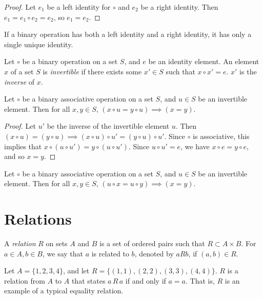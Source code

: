 \begin{proof}
    Let $e_1$ be a left identity for $\circ$ and $e_2$ be a right identity. Then $e_1 = e_1 \circ e_2 = e_2$, so $e_1 = e_2$.
\end{proof}

\begin{cor}
    If a binary operation has both a left identity and a right identity, it has only a single unique identity.
\end{cor}

\begin{defn}
    Let $\circ$ be a binary operation on a set $S$, and $e$ be an identity element. An element $x$ of a set $S$ is \emph{invertible} if there exists some $x' \in S$ such that $x \circ x' = e$. $x'$ is the \emph{inverse} of $x$.
\end{defn}

\begin{thm}
    Let $\circ$ be a binary associative operation on a set $S$, and $u \in S$ be an invertible element. Then for all $x, y \in S$, $(x \circ u = y \circ u) \implies (x = y)$.
\end{thm}

\begin{proof}
    Let $u'$ be the inverse of the invertible element $u$. Then $(x \circ u) = (y \circ u) \implies (x \circ u) \circ u' = (y \circ u) \circ u'$. Since $\circ$ is associative, this implies that $x \circ (u \circ u') = y \circ (u \circ u')$. Since $u \circ u' = e$, we have $x \circ e = y \circ e$, and so $x = y$.
\end{proof}

\begin{cor}
    Let $\circ$ be a binary associative operation on a set $S$, and $u \in S$ be an invertible element. Then for all $x, y \in S$, $(u \circ x = u \circ y) \implies (x = y)$.
\end{cor}

\section{Relations}

\begin{defn}
    A \emph{relation} $R$ on sets $A$ and $B$ is a set of ordered pairs such that $R \subset A \times B$. For $a \in A, b \in B$, we say that $a$ is related to $b$, denoted by $a R b$, if $(a, b) \in R$.
\end{defn}

\begin{exmp}
    Let $A = \{1, 2, 3, 4\}$, and let $R = \{(1, 1), (2, 2), (3, 3), (4, 4)\}$. $R$ is a relation from $A$ to $A$ that states $a \,R\, a$ if and only if $a = a$. That is, $R$ is an example of a typical equality relation.
\end{exmp}

